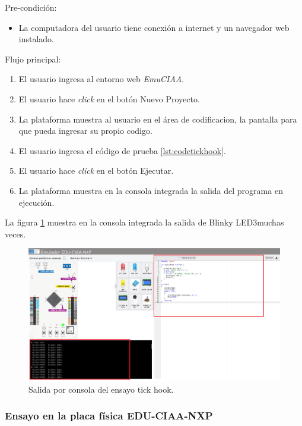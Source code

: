 Pre-condición: 
\begin{itemize}
	\item La computadora del usuario tiene conexión a internet y un navegador web instalado.
\end{itemize}

Flujo principal:
\begin{enumerate}
	\item El usuario ingresa al entorno web \textit{EmuCIAA}.
	\item El usuario hace \textit{click} en el botón \textquotedbl Nuevo Proyecto\textquotedbl.
	\item La plataforma muestra al usuario en el área de codificacion, la pantalla para que pueda ingresar su propio codigo.
	\item El usuario ingresa el código de prueba \ref{lst:codetickhook}.
	\item El usuario hace \textit{click} en el botón \textquotedbl Ejecutar\textquotedbl.
	\item La plataforma muestra en la consola integrada la salida del programa en ejecución.
\end{enumerate}
	
La figura \ref{fig:Testtickhook} muestra en la consola integrada la salida de \textquotedbl Blinky LED3\textquotedbl muchas veces. 

\begin{figure}[ht]
	\centering
	\includegraphics[scale=.20]{./Figures/Testtickhook.png}
	\caption{Salida por consola del ensayo tick hook.}
	\label{fig:Testtickhook}
\end{figure}

\subsubsection{Ensayo en la placa física EDU-CIAA-NXP} 


